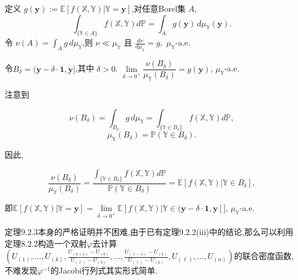 \begin{itemize}
    定义 \(g(\mathbf{y}):= \mathbb{E}[f(\mathbb{X},\mathbb{Y})| \mathbb{Y} = \mathbf{y}]\),对任意Borel集 \(A\), 
    \[\int_{\{\mathbb{Y} \in A\}} f(\mathbb{X},\mathbb{Y}) d\mathbb{P} = \int_A g(\mathbf{y}) \, d\mu_{\mathbb{Y}}(\mathbf{y}).\]
    令 \(\nu(A) = \int_A g \, d\mu_{\mathbb{Y}}\),则 \(\nu \ll \mu_{\mathbb{Y}}\) 且 \(\frac{d\nu}{d\mu_{\mathbb{Y}}} = g,\) \(\mu_{\mathbb{Y}}\)-a.e.

    令\(B_\delta = (\mathbf{y} - \delta \cdot \mathbf{1}, \mathbf{y}]\),其中 \(\delta > 0\). $\lim\limits_{\delta \to 0^+} \dfrac{\nu(B_\delta)}{\mu_{\mathbb{Y}}(B_\delta)} = g(\mathbf{y})$, \(\mu_{\mathbb{Y}}\)-a.e.

    注意到

    \[\nu(B_\delta) = \int_{B_\delta} g \, d\mu_{\mathbb{Y}} = \int_{\{\mathbb{Y} \in B_\delta\}} f(\mathbb{X},\mathbb{Y}) d\mathbb{P},\]
    \[\mu_{\mathbb{Y}}(B_\delta) = \mathbb{P}(\mathbb{Y} \in B_\delta).\]
    
    因此,

    \[\frac{\nu(B_\delta)}{\mu_{\mathbb{Y}}(B_\delta)} 
    = \dfrac{\int_{\{\mathbb{Y} \in B_\delta\}} f(\mathbb{X},\mathbb{Y}) d\mathbb{P}}{\mathbb{P}(\mathbb{Y} \in B_\delta)} 
    = \mathbb{E}[f(\mathbb{X},\mathbb{Y}) | \mathbb{Y} \in B_\delta],\]

     即$\mathbb{E}[f(\mathbb{X},\mathbb{Y}) | \mathbb{Y} = \mathbf{y}]=
     \lim\limits_{\delta \to 0^+} \mathbb{E}[f(\mathbb{X},\mathbb{Y}) | \mathbb{Y} \in (\mathbf{y} - \delta \cdot \mathbf{1}, \mathbf{y}]],$\,\(\mu_{\mathbb{Y}}\)-a.e.
    
    定理9.2.3本身的严格证明并不困难,由于已有定理9.2.2(iii)中的结论,那么可以利用定理8.2.2构造一个双射$\varphi$去计算$(U_{(1)},\ldots,U_{(k)},\frac{U_{(k+1)}-U_{(k)}}{U_{(\ell)}-U_{(k)}},\ldots,\frac{U_{(\ell-1)}-U_{(k)}}{U_{(\ell)}-U_{(k)}} , U_{(\ell)},\ldots,U_{(n)} )$的联合密度函数,不难发现$\varphi^{-1}$的Jacobi行列式其实形式简单.
    
\end{itemize}

